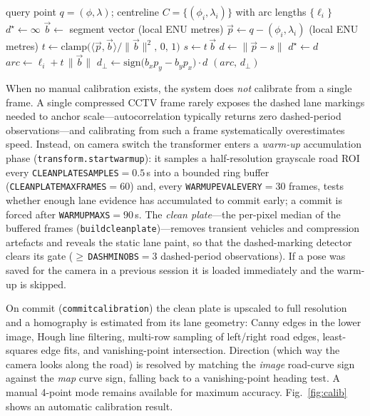 \documentclass[conference]{IEEEtran}
\renewcommand{\_}{\textunderscore\allowbreak}
\begin{document}
\begin{algorithm}
\caption{\textsc{PerpProject}: perpendicular projection onto centreline}
\label{alg:perp}
\begin{algorithmic}[1]
\Require query point $q=(\phi,\lambda)$; centreline $C=\{(\phi_i,\lambda_i)\}$
         with arc lengths $\{\ell_i\}$
\State $d^\star \gets \infty$
    \State $\vec{b} \gets$ segment vector (local ENU metres)
    \State $\vec{p} \gets q - (\phi_i,\lambda_i)$ (local ENU metres)
    \State $t \gets \mathrm{clamp}\big(\langle \vec{p},\vec{b}\rangle / \lVert\vec{b}\rVert^2,\, 0,\, 1\big)$
    \State $s \gets t\,\vec{b}$ 
    \State $d \gets \lVert \vec{p}-s \rVert$
        \State $d^\star \gets d$
        \State $\textit{arc} \gets \ell_i + t\,\lVert\vec{b}\rVert$
        \State $d_\perp \gets \mathrm{sign}\big(b_x p_y - b_y p_x\big)\cdot d$
    \EndIf
\EndFor
\State \Return $(\textit{arc},\, d_\perp)$
\end{algorithmic}
\end{algorithm}

When no manual calibration exists, the system does \emph{not} calibrate from a single
frame. A single compressed CCTV frame rarely exposes the dashed lane markings needed to
anchor scale---autocorrelation typically returns zero dashed-period observations---and
calibrating from such a frame systematically overestimates speed. Instead, on camera
switch the transformer enters a \emph{warm-up} accumulation phase
(\texttt{transform.start\_warmup}): it samples a half-resolution grayscale road ROI every
\texttt{CLEANPLATE\_SAMPLE\_S}${=}0.5$\,s into a bounded ring buffer
(\texttt{CLEANPLATE\_MAX\_FRAMES}${=}60$) and, every \texttt{WARMUP\_EVAL\_EVERY}${=}30$
frames, tests whether enough lane evidence has accumulated to commit early; a commit is
forced after \texttt{WARMUP\_MAX\_S}${=}90$\,s. The \emph{clean plate}---the per-pixel
median of the buffered frames (\texttt{\_build\_clean\_plate})---removes transient vehicles
and compression artefacts and reveals the static lane paint, so that the dashed-marking
detector clears its gate ($\ge$\,\texttt{DASH\_MIN\_OBS}${=}3$ dashed-period observations).
If a pose was saved for the camera in a previous session it is loaded immediately and the
warm-up is skipped.

On commit (\texttt{commit\_calibration}) the clean plate is upscaled to full resolution and
a homography is estimated from its lane geometry: Canny edges in the lower image, Hough line
filtering, multi-row sampling of left/right road edges, least-squares edge fits, and
vanishing-point intersection. Direction (which way the camera looks along the road) is
resolved by matching the \emph{image} road-curve sign against the \emph{map} curve sign,
falling back to a vanishing-point heading test. A manual 4-point mode remains available for
maximum accuracy. Fig.~\ref{fig:calib} shows an automatic calibration result.
\end{document}
